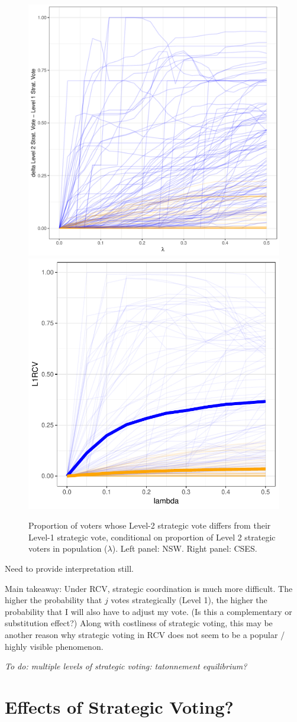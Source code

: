 \documentclass[11pt, letter, margin = 2 in]{article}
\begin{document}
\begin{figure}[!h]
	\centering
	\includegraphics[width = .45 \textwidth]{"../output/figures/level1_diff"}
	\includegraphics[width = .45 \textwidth]{"../output/figures/cses_l1"}
	\caption{Proportion of voters whose Level-2 strategic vote differs from their Level-1 strategic vote, conditional on proportion of Level 2 strategic voters in population ($\lambda$). Left panel: NSW. Right panel: CSES.}
	\label{fig:figure1}
\end{figure}

Need to provide interpretation still.

Main takeaway: Under RCV, strategic coordination is much more difficult. The higher the probability that $j$ votes strategically (Level 1), the higher the probability that I will also have to adjust my vote. (Is this a complementary or substitution effect?) Along with costliness of strategic voting, this may be another reason why strategic voting in RCV does not seem to be a popular / highly visible phenomenon.

\textit{To do: multiple levels of strategic voting: tatonnement equilibrium?}

\section{Effects of Strategic Voting?}
\end{document}
